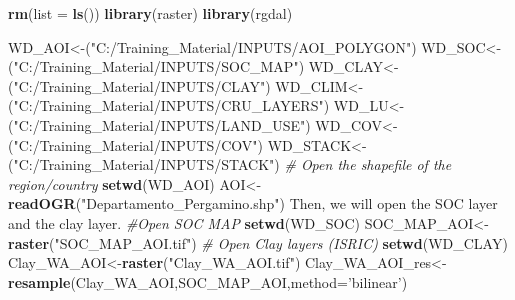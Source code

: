 \documentclass[
  10pt,
  b5paper,
]{book}
\newenvironment{Shaded}{\begin{snugshade}}{\end{snugshade}}
\newcommand{\CommentTok}[1]{\textcolor[rgb]{0.56,0.35,0.01}{\textit{#1}}}
\newcommand{\DataTypeTok}[1]{\textcolor[rgb]{0.13,0.29,0.53}{#1}}
\newcommand{\KeywordTok}[1]{\textcolor[rgb]{0.13,0.29,0.53}{\textbf{#1}}}
\newcommand{\NormalTok}[1]{#1}
\newcommand{\StringTok}[1]{\textcolor[rgb]{0.31,0.60,0.02}{#1}}
\begin{document}
\begin{Shaded}
\begin{Highlighting}[]
\KeywordTok{rm}\NormalTok{(}\DataTypeTok{list =} \KeywordTok{ls}\NormalTok{())}
\KeywordTok{library}\NormalTok{(raster)}
\KeywordTok{library}\NormalTok{(rgdal)}

\NormalTok{WD_AOI<-(}\StringTok{"C:/Training_Material/INPUTS/AOI_POLYGON"}\NormalTok{)}
\NormalTok{WD_SOC<-(}\StringTok{"C:/Training_Material/INPUTS/SOC_MAP"}\NormalTok{)}
\NormalTok{WD_CLAY<-(}\StringTok{"C:/Training_Material/INPUTS/CLAY"}\NormalTok{)}
\NormalTok{WD_CLIM<-(}\StringTok{"C:/Training_Material/INPUTS/CRU_LAYERS"}\NormalTok{)}
\NormalTok{WD_LU<-(}\StringTok{"C:/Training_Material/INPUTS/LAND_USE"}\NormalTok{)}
\NormalTok{WD_COV<-(}\StringTok{"C:/Training_Material/INPUTS/COV"}\NormalTok{)}
\NormalTok{WD_STACK<-(}\StringTok{"C:/Training_Material/INPUTS/STACK"}\NormalTok{)}
\CommentTok{# Open the shapefile of the region/country}
\KeywordTok{setwd}\NormalTok{(WD_AOI)}
\NormalTok{AOI<-}\KeywordTok{readOGR}\NormalTok{(}\StringTok{"Departamento_Pergamino.shp"}\NormalTok{)}
\NormalTok{Then, we will open the SOC layer and the clay layer.}
\CommentTok{#Open SOC MAP }
\KeywordTok{setwd}\NormalTok{(WD_SOC)}
\NormalTok{SOC_MAP_AOI<-}\KeywordTok{raster}\NormalTok{(}\StringTok{"SOC_MAP_AOI.tif"}\NormalTok{)}
\CommentTok{# Open Clay layers  (ISRIC)}
\KeywordTok{setwd}\NormalTok{(WD_CLAY)}
\NormalTok{Clay_WA_AOI<-}\KeywordTok{raster}\NormalTok{(}\StringTok{"Clay_WA_AOI.tif"}\NormalTok{)}
\NormalTok{Clay_WA_AOI_res<-}\KeywordTok{resample}\NormalTok{(Clay_WA_AOI,SOC_MAP_AOI,}\DataTypeTok{method=}\StringTok{'bilinear'}\NormalTok{) }


\end{Highlighting}
\end{Shaded}
\end{document}

